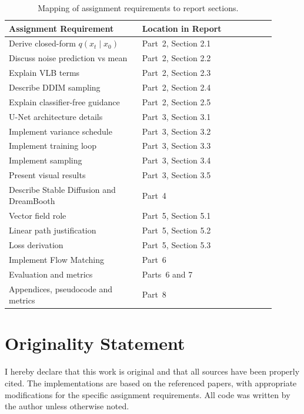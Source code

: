 \begin{table}[H]
  \centering
  \begin{tabular}{p{0.45\linewidth}p{0.45\linewidth}}
    \toprule
    Assignment Requirement & Location in Report \\
    \midrule
    Derive closed-form $q(x_t\mid x_0)$ & Part~2, Section 2.1 \\
    Discuss noise prediction vs mean & Part~2, Section 2.2 \\
    Explain VLB terms & Part~2, Section 2.3 \\
    Describe DDIM sampling & Part~2, Section 2.4 \\
    Explain classifier-free guidance & Part~2, Section 2.5 \\
    U-Net architecture details & Part~3, Section 3.1 \\
    Implement variance schedule & Part~3, Section 3.2 \\
    Implement training loop & Part~3, Section 3.3 \\
    Implement sampling & Part~3, Section 3.4 \\
    Present visual results & Part~3, Section 3.5 \\
    Describe Stable Diffusion and DreamBooth & Part~4 \\
    Vector field role & Part~5, Section 5.1 \\
    Linear path justification & Part~5, Section 5.2 \\
    Loss derivation & Part~5, Section 5.3 \\
    Implement Flow Matching & Part~6 \\
    Evaluation and metrics & Parts~6 and 7 \\
    Appendices, pseudocode and metrics & Part~8 \\
    \bottomrule
  \end{tabular}
  \caption{Mapping of assignment requirements to report sections.}
  \label{tab:assignmentmap}
\end{table}

\section{Originality Statement}

I hereby declare that this work is original and that all sources have
been properly cited.  The implementations are based on the referenced
papers, with appropriate modifications for the specific assignment
requirements.  All code was written by the author unless otherwise
noted.

